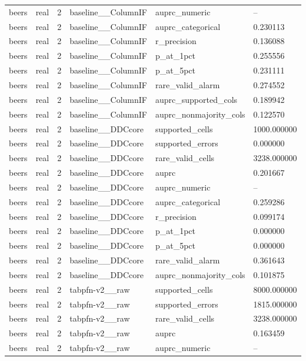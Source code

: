 \begin{tabular}{llllll}
beers & real & 2 & baseline\_\_ColumnIF & auprc\_numeric & -- \\
beers & real & 2 & baseline\_\_ColumnIF & auprc\_categorical & 0.230113 \\
beers & real & 2 & baseline\_\_ColumnIF & r\_precision & 0.136088 \\
beers & real & 2 & baseline\_\_ColumnIF & p\_at\_1pct & 0.255556 \\
beers & real & 2 & baseline\_\_ColumnIF & p\_at\_5pct & 0.231111 \\
beers & real & 2 & baseline\_\_ColumnIF & rare\_valid\_alarm & 0.274552 \\
beers & real & 2 & baseline\_\_ColumnIF & auprc\_supported\_cols & 0.189942 \\
beers & real & 2 & baseline\_\_ColumnIF & auprc\_nonmajority\_cols & 0.122570 \\
beers & real & 2 & baseline\_\_DDCcore & supported\_cells & 1000.000000 \\
beers & real & 2 & baseline\_\_DDCcore & supported\_errors & 0.000000 \\
beers & real & 2 & baseline\_\_DDCcore & rare\_valid\_cells & 3238.000000 \\
beers & real & 2 & baseline\_\_DDCcore & auprc & 0.201667 \\
beers & real & 2 & baseline\_\_DDCcore & auprc\_numeric & -- \\
beers & real & 2 & baseline\_\_DDCcore & auprc\_categorical & 0.259286 \\
beers & real & 2 & baseline\_\_DDCcore & r\_precision & 0.099174 \\
beers & real & 2 & baseline\_\_DDCcore & p\_at\_1pct & 0.000000 \\
beers & real & 2 & baseline\_\_DDCcore & p\_at\_5pct & 0.000000 \\
beers & real & 2 & baseline\_\_DDCcore & rare\_valid\_alarm & 0.361643 \\
beers & real & 2 & baseline\_\_DDCcore & auprc\_nonmajority\_cols & 0.101875 \\
beers & real & 2 & tabpfn-v2\_\_raw & supported\_cells & 8000.000000 \\
beers & real & 2 & tabpfn-v2\_\_raw & supported\_errors & 1815.000000 \\
beers & real & 2 & tabpfn-v2\_\_raw & rare\_valid\_cells & 3238.000000 \\
beers & real & 2 & tabpfn-v2\_\_raw & auprc & 0.163459 \\
beers & real & 2 & tabpfn-v2\_\_raw & auprc\_numeric & -- \\

\end{tabular}
